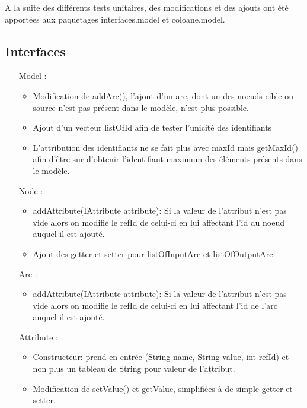 \documentclass{article}
\begin{document}
A la suite des diff\'erents tests unitaires, des modifications et des ajouts ont \'et\'e apport\'ees aux paquetages interfaces.model et coloane.model.

\subsection{Interfaces}

\begin{itemize}
	\item[Model]
		:
		\begin{itemize}
			\item Modification de addArc(), l'ajout d'un arc, dont un des noeuds cible ou source
			n'est pas pr\'esent dans le mod\`ele, n'est plus possible.
			\item Ajout d'un vecteur listOfId afin de tester l'unicit\'e des identifiants
			\item L'attribution des identifiants ne se fait plus avec maxId mais getMaxId()
			afin d'\^etre sur d'obtenir l'identifiant maximum des \'el\'ements pr\'esents dans le mod\`ele.
		\end{itemize}

	\item[Node]
		:
		\begin{itemize}
			\item addAttribute(IAttribute attribute): Si la valeur de l'attribut n'est pas vide 
			alors on modifie le refId de celui-ci en lui affectant l'id du noeud auquel il est ajout\'e. 
			\item Ajout des getter et setter pour listOfInputArc et listOfOutputArc.
		\end{itemize}

	\item[Arc]
		:
		\begin{itemize}
			\item addAttribute(IAttribute attribute): Si la valeur de l'attribut n'est pas vide 
			alors on modifie le refId de celui-ci en lui affectant l'id de l'arc auquel il est ajout\'e. 
		\end{itemize}

	\item[Attribute]
		:
		\begin{itemize}
			\item Constructeur: prend en entr\'ee (String name, String value, int refId) et non plus un tableau de String pour valeur de l'attribut.
			\item Modification de setValue() et getValue, simplifi\'ees \`a de simple getter et setter. 
		\end{itemize}
	

\end{itemize}
\end{document}
